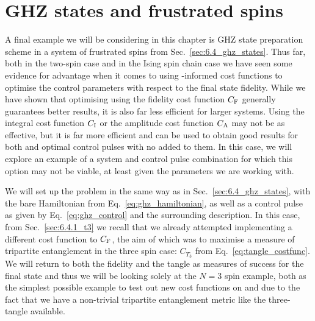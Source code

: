 \section{GHZ states and frustrated spins}\label{sec:7.3_ghz_ho}

A final example we will be considering in this chapter is GHZ state preparation scheme in a system of frustrated spins from Sec.~\ref{sec:6.4_ghz_states}. Thus far, both in the two-spin case and in the Ising spin chain case we have seen some evidence for advantage when it comes to using -informed cost functions to optimise the control parameters with respect to the final state fidelity. While we have shown that optimising using the fidelity cost function $C_{\rm F}$ generally guarantees better results, it is also far less efficient for larger systems. Using the integral cost function $C_{\rm I}$ or the amplitude cost function $C_{\rm A}$ may not be as effective, but it is far more efficient and can be used to obtain good results for both  and optimal control pulses with no  added to them. In this case, we will explore an example of a system and control pulse combination for which this option may not be viable, at least given the parameters we are working with.

We will set up the problem in the same way as in Sec.~\ref{sec:6.4_ghz_states}, with the bare Hamiltonian from Eq.~\eqref{eq:ghz_hamiltonian}, as well as a  control pulse as given by Eq.~\eqref{eq:ghz_control} and the surrounding description. In this case, from Sec.~\ref{sec:6.4.1_t3} we recall that we already attempted implementing a different cost function to $C_{\rm F}$, the aim of which was to maximise a measure of tripartite entanglement in the three spin case: $C_{T_3}$ from Eq.~\eqref{eq:tangle_costfunc}. We will return to both the fidelity and the tangle as measures of success for the final state and thus we will be looking solely at the $N=3$ spin example, both as the simplest possible example to test out new cost functions on and due to the fact that we have a non-trivial tripartite entanglement metric like the three-tangle available.

